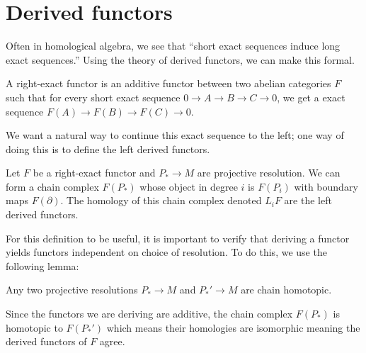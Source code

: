 \section{Derived functors}
Often in homological algebra, we see that ``short exact
sequences induce long exact sequences.'' Using the theory of
derived functors, we can make this formal.

\begin{definition} A right-exact functor is an additive functor
between two abelian categories $F$ such that for every short
exact sequence $0\rightarrow A\rightarrow B\rightarrow
C\rightarrow 0$, we get a exact sequence $F(A)\rightarrow
F(B)\rightarrow F(C)\rightarrow 0$.
\end{definition}
We want a natural way to continue this exact sequence to the
left; one way of doing this is to define the left derived
functors.
\begin{definition} Let $F$ be a right-exact functor and
$P_*\rightarrow M$ are projective resolution. We can form a
chain complex $F(P_*)$ whose object in degree $i$ is $F(P_i)$
with boundary maps $F(\partial)$. The homology of this chain
complex denoted $L_iF$ are the left derived functors.
\end{definition}

For this definition to be useful, it is important to verify that
deriving a functor yields functors independent on choice of
resolution. To do this, we use the following lemma:

\begin{lemma} Any two projective resolutions $P_*\rightarrow M$
and $P_*'\rightarrow M$ are chain homotopic. \end{lemma}
\begin{corollary}Since the functors we are deriving are
additive, the chain complex $F(P_*)$ is homotopic to $F(P_*')$
which means their homologies are isomorphic meaning the derived
functors of $F$ agree.\end{corollary}

